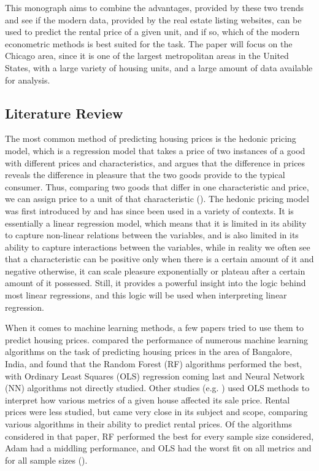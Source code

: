 \documentclass[12pt]{report}
\begin{document}
This monograph aims to combine the advantages, provided by these two trends and see if the modern data, provided by the real estate listing websites, can be used to predict the rental price of a given unit, and if so, which of the modern econometric methods is best suited for the task. The paper will focus on the Chicago area, since it is one of the largest metropolitan areas in the United States, with a large variety of housing units, and a large amount of data available for analysis.

\subsection{Literature Review}

The most common method of predicting housing prices is the hedonic pricing model, which is a regression model that takes a price of two instances of a good with different prices and characteristics, and argues that the difference in prices reveals the difference in pleasure that the two goods provide to the typical consumer. Thus, comparing two goods that differ in one characteristic and price, we can assign price to a unit of that characteristic (\cite{taylor2003}). The hedonic pricing model was first introduced by \cite{rosen1974} and has since been used in a variety of contexts.  It is essentially a linear regression model, which means that it is limited in its ability to capture non-linear relations between the variables, and is also limited in its ability to capture interactions between the variables, while in reality we often see that a characteristic can be positive only when there is a certain amount of it and negative otherwise, it can scale pleasure exponentially or plateau after a certain amount of it possessed. Still, it provides a powerful insight into the logic behind most linear regressions, and this logic will be used when interpreting linear regression.

When it comes to machine learning methods, a few papers tried to use them to predict housing prices. \cite{joshi2022} compared the performance of numerous machine learning algorithms on the task of predicting housing prices in the area of Bangalore, India, and found that the Random Forest (RF) algorithms performed the best, with Ordinary Least Squares (OLS) regression coming last and Neural Network (NN) algorithms not directly studied. Other studies (e.g. \cite{zietz2008}) used OLS methods to interpret how various metrics of a given house affected its sale price. Rental prices were less studied, but \cite{yoshida2022} came very close in its subject and scope, comparing various algorithms in their ability to predict rental prices. Of the algorithms considered in that paper, RF performed the best for every sample size considered, Adam had a middling performance, and OLS had the worst fit on all metrics and for all sample sizes (\cite[p. 19]{yoshida2022}).
\end{document}
